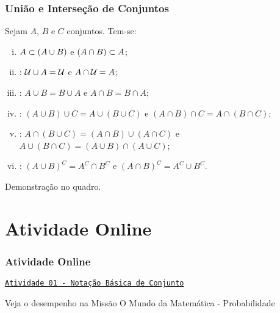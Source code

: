 \documentclass[brazil, notheorems, 10pt]{beamer}
\begin{document}
\begin{frame}
\frametitle{União e Interseção de Conjuntos} %
\begin{Prop} \label{propuniaoint}
Sejam $A$, $B$ e $C$ conjuntos. Tem-se:
\begin{enumerate}[i.]
	\item $A \subset \left(A \cup B\right)$ e $\left(A \cap B\right) \subset A$;
	\item {}: $\mathcal U \cup A = \mathcal U$ e $A \cap \mathcal U = A$;
	\item {}: $A \cup B = B \cup A$ e $A \cap B = B \cap A$;
	\item {}: $\left(A \cup B \right) \cup C = A
	\cup \left( B \cup C \right)$ e $\left(A \cap B \right) \cap C = A
	\cap \left( B \cap C \right)$;

	\item {}: $A \cap
	\left( B \cup C \right) = \left(A \cap B \right) \cup \left( A \cap C
	\right)$ e $A \cup \left( B \cap C \right) = \left(A \cup B \right) \cap
	\left( A \cup C  \right)$;

	\item {}: $\left( A \cup B \right)^C = A^C \cap
	B^C$ e $\left(A \cap B \right)^C = A^C \cup B^C$.

	\end{enumerate}
\end{Prop}

Demonstração no quadro.


\end{frame}

\section{Atividade Online}
\begin{frame}
\frametitle{Atividade Online} %

\href{https://pt.khanacademy.org/math/statistics-probability/probability-library/basic-set-ops/e/basic_set_notation}
{{\tt Atividade 01 - Notação Básica de Conjunto}}

Veja o desempenho na Missão O Mundo da Matemática - Probabilidade


\end{frame}
\end{document}
